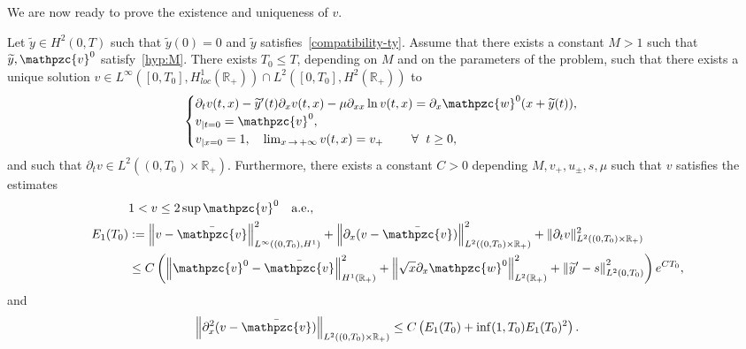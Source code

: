 \documentclass[AHL,Unicode,longabstracts,published]{cedram}
\newcommand{\R}{\mathbb{R}}
\newcommand{\p}{\partial}
\newcommand{\bv}{\bar{\mathpzc{v}}}
\newcommand{\tv}{\mathpzc{v}}
\newcommand{\tw}{\mathpzc{w}}
\newcommand{\ty}{\widetilde{y}}
\let\oldforall\forall
\renewcommand*{\forall}{\mathrel{\oldforall}}
\begin{document}
We are now ready to prove the existence and uniqueness of $v$.


\begin{lemm}\label{lem:WP-vn}
Let $\ty\in H^2(0,T)$ such that $\ty(0)=0$ and $\ty$ satisfies~\eqref{compatibility-ty}. Assume that there exists a constant $M>1$ such that $\ty, \tv^0$ satisfy~\eqref{hyp:M}. There exists $T_0\leq T$, depending on $M$ and on the parameters of the problem, such that there exists a unique solution $v \in L^\infty([0,T_0], H^1_{loc}(\R_+))\cap L^2([0,T_0], H^2(\R_+))$ to
\begin{equation}\label{eq:v}
\begin{cases}
\partial_t v(t,x) -\ty'(t) \partial_x v(t,x) - \mu \partial_{xx} \ln v(t,x) = \partial_x \tw^0(x+\ty(t)), \\
v_{|t=0}=\tv^0,\\
v_{|x=0}=1,\quad \lim_{x\,\to\,+\infty} v(t,x) = v_+ \qquad \forall \ t \geq 0,
\end{cases}
\end{equation}
and such that $\p_t v \in L^2((0,T_0)\times \R_+)$. Furthermore, there exists a constant $C>0$ depending $M, v_+, u_\pm, s,\mu$ such that $v$ satisfies the estimates
\begin{align}
& 1 <v\leq 2 \sup \tv^0\quad \text{a.e.},\\
E_1(T_0) &:= \left\|v-\bv\right\|_{L^\infty((0,T_0), H^1)}^2 + \left\|\p_x (v-\bv)\right\|_{L^2((0,T_0)\times \R_+)}^2 + \|\p_t v\|_{L^2 ((0,T_0)\times \R_+)}^2\nonumber\\
&\leq C\left(\left\|\tv^0 -\bv\right\|_{H^1(\R_+)}^2 + \left\|\sqrt{x} \partial_x\tw^0\right\|_{L^2(\R_+)}^2 + \left\|\ty'-s\right\|_{L^2(0,T_0)}^2\right) e^{CT_0}, \label{est:H1-v}
\end{align}
and
\[
\left\|\p_x^2 (v-\bv)\right\|_{L^2((0,T_0)\times \R_+)}\leq C \left(E_1(T_0) + \inf(1, T_0)E_1(T_0)^2\right).
\]
\end{lemm}
\end{document}
